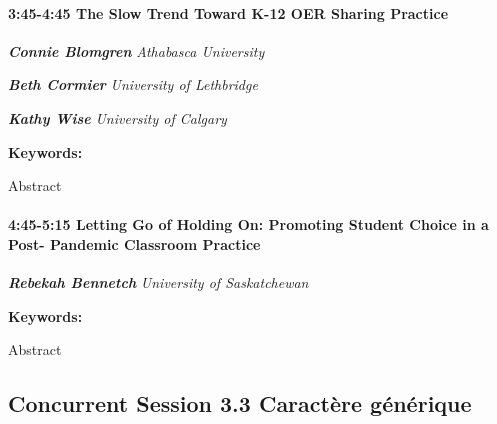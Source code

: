 \documentclass[
]{book}
\begin{document}
\begin{session}
\hypertarget{the-slow-trend-toward-k-12-oer-sharing-practice}{%
\paragraph*{\texorpdfstring{3:45-4:45 \textbar{} \textbf{The Slow Trend
Toward K-12 OER Sharing} \textbar{}
Practice}{3:45-4:45 \textbar{} The Slow Trend Toward K-12 OER Sharing \textbar{} Practice}}\label{the-slow-trend-toward-k-12-oer-sharing-practice}}

\textbf{\emph{Connie Blomgren}} \textbar{} \emph{Athabasca University}

\textbf{\emph{Beth Cormier}} \textbar{} \emph{University of Lethbridge}

\textbf{\emph{Kathy Wise}} \textbar{} \emph{University of Calgary}

\textbf{Keywords:}

Abstract
\end{session}

\begin{session}
\hypertarget{letting-go-of-holding-on-promoting-student-choice-in-a-post--pandemic-classroom-practice}{%
\paragraph*{\texorpdfstring{4:45-5:15 \textbar{} \textbf{Letting Go of
Holding On: Promoting Student Choice in a Post- Pandemic Classroom}
\textbar{}
Practice}{4:45-5:15 \textbar{} Letting Go of Holding On: Promoting Student Choice in a Post- Pandemic Classroom \textbar{} Practice}}\label{letting-go-of-holding-on-promoting-student-choice-in-a-post--pandemic-classroom-practice}}

\textbf{\emph{Rebekah Bennetch}} \textbar{} \emph{University of
Saskatchewan}

\textbf{Keywords:}

Abstract
\end{session}

\hypertarget{concurrent-session-3.3-wildcard}{%
\subsection*{Concurrent Session 3.3 \textbar{} Caractère générique}\label{concurrent-session-3.3-wildcard}}
\end{document}
